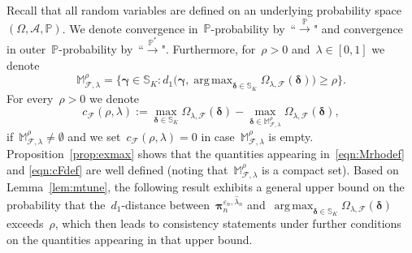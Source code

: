 \documentclass[11pt, a4paper]{article}
\DeclareMathOperator*{\argmax}{arg\,max}
\newcommand{\cp}{\xrightarrow{\mathbb{P}}}
\newcommand{\cps}{\xrightarrow{\mathbb{P}^*}}
\theoremstyle{definition}
\begin{document}
Recall that all random variables are defined on an underlying probability space~$(\Omega, \mathcal{A}, \mathbb{P})$. We denote convergence in~$\mathbb{P}$-probability by~``$\cp$" and convergence in outer~$\mathbb{P}$-probability by~``$\cps$". Furthermore, for~$\rho > 0$ and~$\lambda \in [0, 1]$  we denote
%
\begin{equation}\label{eqn:Mrhodef}
\mathbb{M}_{\mathcal{F}, \lambda}^{\rho} = \big\{\bm{\gamma} \in \mathbb{S}_K : d_1\big( 
\bm{\gamma},
\argmax_{\bm{\delta} \in \mathbb{S}_K} \Omega_{\lambda, \mathcal{F}}(\bm{\delta})
\big) \geq \rho
\big \}.
\end{equation}
%
For every~$\rho > 0$ we denote
%
\begin{equation}\label{eqn:cFdef}
c_{\mathcal{F}}(\rho, \lambda) :=  \max_{\bm{\delta} \in \mathbb{S}_K} \Omega_{\lambda, \mathcal{F}}(\bm{\delta}) - \max_{\bm{\delta} \in \mathbb{M}_{\mathcal{F},  \lambda}^{\rho}} \Omega_{\lambda, \mathcal{F}}(\bm{\delta}),
\end{equation}
%
if~$\mathbb{M}_{\mathcal{F},  \lambda}^{\rho} \neq \emptyset$ and we set~$c_{\mathcal{F}}(\rho, \lambda) = 0$ in case~$\mathbb{M}_{\mathcal{F},  \lambda}^{\rho}$ is empty. Proposition~\ref{prop:exmax} shows that the quantities appearing in~\eqref{eqn:Mrhodef} and \eqref{eqn:cFdef} are well defined (noting that~$\mathbb{M}_{\mathcal{F}, \lambda}^{\rho}$ is a compact set). Based on Lemma~\ref{lem:mtune}, the following result exhibits a general upper bound on the probability that the~$d_1$-distance between~$\bm{\pi}_{n}^{\varepsilon_n, \hat{\lambda}_{n}}$ and~$\argmax_{\bm{\delta} \in \mathbb{S}_K} \Omega_{\lambda, \mathcal{F}}(\bm{\delta})$ exceeds~$\rho$, which then leads to consistency statements under further conditions on the quantities appearing in that upper bound. 
% 
\end{document}
